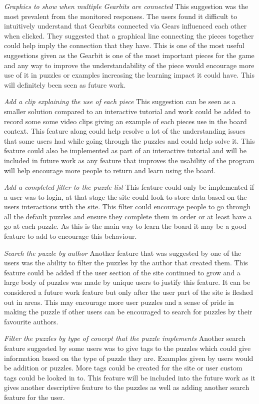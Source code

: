 \documentclass{l4proj}
\begin{document}
\emph{Graphics to show when multiple Gearbits are connected}
This suggestion was the most prevalent from the monitored responses. The users found it difficult to intuitively understand that Gearbits connected via Gears influenced each other when clicked. They suggested that a graphical line connecting the pieces together could help imply the connection that they have. This is one of the most useful suggestions given as the Gearbit is one of the most important pieces for the game and any way to improve the understandability of the piece would encourage more use of it in puzzles or examples increasing the learning impact it could have. This will definitely been seen as future work.

\emph{Add a clip explaining the use of each piece}
This suggestion can be seen as a smaller solution compared to an interactive tutorial and work could be added to record some some video clips giving an example of each pieces use in the board context. This feature along could help resolve a lot of the understanding issues that some users had while going through the puzzles and could help solve it. This feature could also be implemented as part of an interactive tutorial and will be included in future work as any feature that improves the usability of the program will help encourage more people to return and learn using the board.

\emph{Add a completed filter to the puzzle list}
This feature could only be implemented if a user was to login, at that stage the site could look to store data based on the users interactions with the site. This filter could encourage people to go through all the default puzzles and ensure they complete them in order or at least have a go at each puzzle. As this is the main way to learn the board it may be a good feature to add to encourage this behaviour. 

\emph{Search the puzzle by author}
Another feature that was suggested by one of the users was the ability to filter the puzzles by the author that created them. This feature could be added if the user section of the site continued to grow and a large body of puzzles was made by unique users to justify this feature. It can be considered a future work feature but only after the user part of the site is fleshed out in areas. This may encourage more user puzzles and a sense of pride in making the puzzle if other users can be encouraged to search for puzzles by their favourite authors.

\emph{Filter the puzzles by type of concept that the puzzle implements}
Another search feature suggested by some users was to give tags to the puzzles which could give information based on the type of puzzle they are. Examples given by users would be addition or puzzles. More tags could be created for the site or user custom tags could be looked in to. This feature will be included into the future work as it gives another descriptive feature to the puzzles as well as adding another search feature for the user. 
\end{document}
